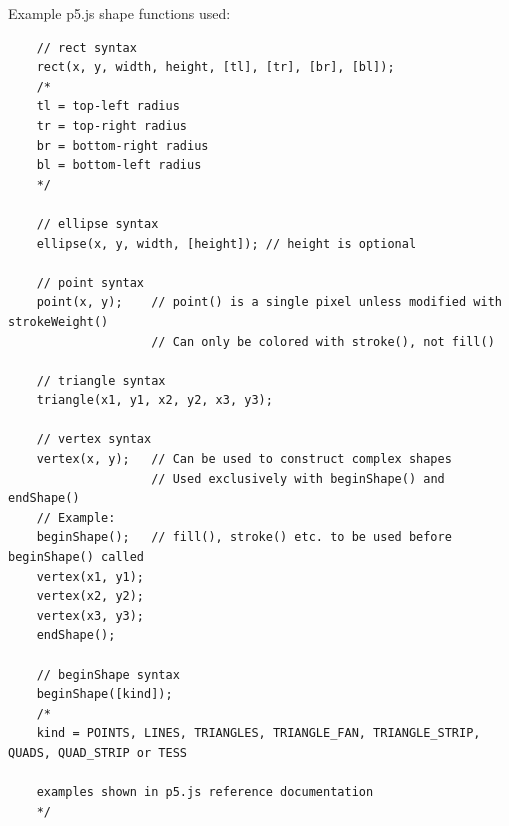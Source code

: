 \documentclass{article}
\begin{document}
\noindent Example p5.js shape functions used:

\begin{verbatim}
    // rect syntax
    rect(x, y, width, height, [tl], [tr], [br], [bl]);
    /*
    tl = top-left radius
    tr = top-right radius
    br = bottom-right radius
    bl = bottom-left radius
    */

    // ellipse syntax
    ellipse(x, y, width, [height]); // height is optional
    
    // point syntax
    point(x, y);    // point() is a single pixel unless modified with strokeWeight()
                    // Can only be colored with stroke(), not fill()
    
    // triangle syntax
    triangle(x1, y1, x2, y2, x3, y3);

    // vertex syntax
    vertex(x, y);   // Can be used to construct complex shapes
                    // Used exclusively with beginShape() and endShape()
    // Example:
    beginShape();   // fill(), stroke() etc. to be used before beginShape() called
    vertex(x1, y1);  
    vertex(x2, y2);
    vertex(x3, y3);
    endShape();

    // beginShape syntax
    beginShape([kind]);
    /*
    kind = POINTS, LINES, TRIANGLES, TRIANGLE_FAN, TRIANGLE_STRIP, QUADS, QUAD_STRIP or TESS

    examples shown in p5.js reference documentation
    */

    \end{verbatim}

    
\end{document}
